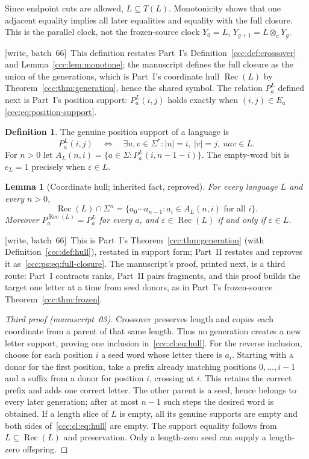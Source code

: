 \documentclass[11pt,letterpaper]{article}
\newtheorem{lemma}[theorem]{Lemma}
\theoremstyle{definition}
\newtheorem{definition}[theorem]{Definition}
\theoremstyle{remark}
\newcommand{\eps}{\varepsilon}
\newcommand{\rec}{\operatorname{Rec}}
\newcommand{\cut}{\otimes_{\mathrm c}}
\newcommand{\wsix}{\textup{[write, batch~66]}}
\begin{document}
Since endpoint cuts are allowed, $L\subseteq T(L)$. Monotonicity shows that
one adjacent equality implies all later equalities and equality with the
full closure. This is the parallel clock, not the frozen-source clock
$Y_0=L$, $Y_{g+1}=L\cut Y_g$.

\wsix\ This definition restates Part~I's Definition~\ref{ccc:def:crossover}
and Lemma~\ref{ccc:lem:monotone}; the manuscript defines the full closure as
the union of the generations, which is Part~I's coordinate hull $\rec(L)$ by
Theorem~\ref{ccc:thm:generation}, hence the shared symbol. The relation
$P_a^L$ defined next is Part~I's position support:
$P_a^L(i,j)$ holds exactly when $(i,j)\in E_a$
\eqref{ccc:eq:position-support}.

\begin{definition}
The genuine position support of a language is
\begin{equation}\label{ccc:cl:eq:support}
 P_a^L(i,j)\quad\Longleftrightarrow\quad
 \exists u,v\in\Sigma^*: |u|=i,\ |v|=j,\ uav\in L.
\end{equation}
For $n>0$ let $A_L(n,i)=\{a\in\Sigma:P_a^L(i,n-1-i)\}$.
The empty-word bit is $e_L=1$ precisely when $\eps\in L$.
\end{definition}

\begin{lemma}[Coordinate hull; inherited fact, reproved]\label{ccc:cl:lem:hull}
For every language $L$ and every $n>0$,
\begin{equation}\label{ccc:cl:eq:hull}
 \rec(L)\cap\Sigma^n
 =\{a_0\cdots a_{n-1}:a_i\in A_L(n,i)\text{ for all }i\}.
\end{equation}
Moreover $P_a^{\rec(L)}=P_a^L$ for every $a$, and
$\eps\in\rec(L)$ if and only if $\eps\in L$.
\end{lemma}
\wsix\ This is Part~I's Theorem~\ref{ccc:thm:generation} (with
Definition~\ref{ccc:def:hull}), restated in support form; Part~II restates and
reproves it as~\eqref{ccc:ps:eq:full-closure}. The manuscript's proof, printed
next, is a third route: Part~I contracts ranks, Part~II pairs fragments, and
this proof builds the target one letter at a time from seed donors, as in
Part~I's frozen-source Theorem~\ref{ccc:thm:frozen}.
\begin{proof}[Third proof (manuscript~03)]
Crossover preserves length and copies each coordinate from a parent of that
same length. Thus no generation creates a new letter support, proving one
inclusion in~\eqref{ccc:cl:eq:hull}.
For the reverse inclusion, choose for each position $i$ a seed word whose
letter there is $a_i$. Starting with a donor for the first position, take a
prefix already matching positions $0,\ldots,i-1$ and a suffix from a donor
for position $i$, crossing at $i$. This retains the correct prefix and adds
one correct letter. The other parent is a seed, hence belongs to every later
generation; after at most $n-1$ such steps the desired word is obtained.
If a length slice of $L$ is empty, all its genuine supports are empty and
both sides of~\eqref{ccc:cl:eq:hull} are empty. The support equality follows from
$L\subseteq\rec(L)$ and preservation. Only a length-zero seed can supply a
length-zero offspring.
\end{proof}
\end{document}
